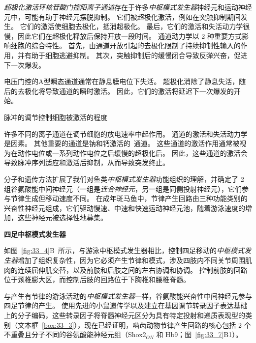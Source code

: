 \begin{proposition}[神经元离子通道有助于中枢模式发生器功能]
	\quad \quad \textit{超极化激活环核苷酸门控阳离子通道}存在于许多\textit{中枢模式发生器}神经元和运动神经元中，可能有助于神经元摆脱抑制。
	它们被超极化激活，例如在突触抑制期间发生。
	它们的激活使细胞去极化，抵消超极化。
	最后，它们的激活和失活动力学很慢，因此它们在超极化释放后保持开放一段时间。
	通道动力学以 2 种重要方式影响细胞的综合特性。
	首先，由通道开放引起的去极化限制了持续抑制性输入的作用，并有助于细胞逃避抑制。
	其次，突触抑制后的缓慢闭合导致反弹兴奋，促进下一次爆发。
	
	\quad \quad 电压门控的A型瞬态通道通常在静息膜电位下失活。
	超极化消除了静息失活，随后的去极化将导致通道的瞬时激活。
	因此，它们的激活将延迟下一次爆发的开始。
	
	\quad \quad \textcolor[HTML]{00A652}{脉冲的调节控制细胞被激活的程度}
	
	\quad \quad 许多不同的离子通道在调节细胞的放电速率中起作用。
	通道的激活和失活动力学是因素。
	其他重要的通道是钠和钙激活的~通道。
	这些通道的激活作用通常被视为在动作电位或一系列动作电位之后缓慢的超极化后。
	因此，这些通道的激活会导致脉冲序列适应和激活后抑制，从而导致突发终止。
	
\end{proposition}


分子和遗传方法扩展了我们对鱼类\textit{中枢模式发生器}功能组织的理解，并确定了 2 组谷氨酸能中间神经元（一组是\textit{连合神经元}，另一组是同侧投射神经元），它们参与节律生成但移动速度不同。
在成年斑马鱼中，节律产生回路由三种功能类别的兴奋性神经元组成，它们驱动慢速、中速和快速运动神经元池，随着游泳速度的增加，这些神经元被选择性地募集。


\textbf{四足中枢模式发生器}

如图~\ref{fig:33_4}B~所示，与游泳中枢模式发生器相比，控制四足移动的\textit{中枢模式发生器}增加了组织复杂性，因为它必须产生节律和模式，涉及四肢内不同关节周围肌肉的连续屈伸肌交替，以及前肢和后肢之间的左右协调和协调。
控制前肢的回路位于颈椎膨大区，而控制后肢的回路位于下胸椎和腰椎脊髓。


与产生有节律的游泳活动的\textit{中枢模式发生器}一样，谷氨酸能兴奋性中间神经元参与四足节律的产生。
使用先进的小鼠遗传学以及建立在基因调节转录因子表达基础上的分子编码，这些转录因子将脊髓神经元区分为具有特定投射和递质表现型的类别（文本框~\ref{box:33_3}），现在已经证明，啮齿动物节律产生回路的核心包括 2 个不重叠且分子不同的谷氨酸能神经元组（Shox2$_{ON} $ 和 Hb9；图~\ref{fig:33_7}B1）。



